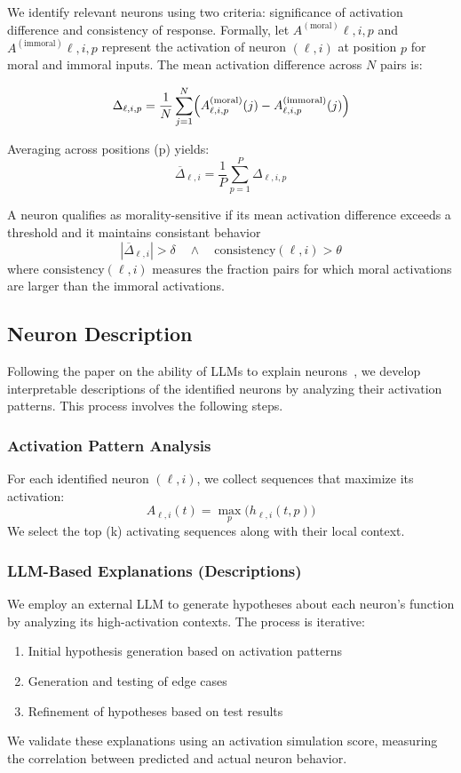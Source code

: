 \documentclass[runninghheads]{llncs}
\begin{document}
We identify relevant neurons using two criteria: significance of activation difference and consistency of response. Formally, let $A^{(\mathrm{moral})}{\ell, i, p}$ and $A^{(\mathrm{immoral})}{\ell, i, p}$ represent the activation of neuron $(\ell, i)$ at position $p$ for moral and immoral inputs. The mean activation difference across $N$ pairs is:

$$
\Delta_{\ell,i, p} = \frac{1}{N} \sum_{j=1}^{N}\Bigl(A^{(\mathrm{moral})}_{\ell, i, p}(j) - A^{(\mathrm{immoral})}_{\ell, i, p}(j)\Bigr)
$$

Averaging across positions (p) yields:
$$
\overline{\Delta}_{\ell, i} = \frac{1}{P} \sum_{p=1}^{P}\Delta_{\ell, i, p}
$$

A neuron qualifies as morality-sensitive if its mean activation difference exceeds a threshold and it maintains consistant behavior
$$
|\overline{\Delta}_{\ell, i}| > \delta   \quad \land \quad \mathrm{consistency}(\ell, i) > \theta
$$
where $\mathrm{consistency}(\ell, i)$ measures the fraction pairs for which moral activations are larger than the immoral activations.


\subsection{Neuron Description}

Following the paper on the ability of LLMs to explain neurons~\cite{bills2023language}, we develop interpretable descriptions of the identified neurons by analyzing their activation patterns. This process involves the following steps.

\subsubsection{Activation Pattern Analysis}
For each identified neuron $(\ell, i)$, we collect sequences that maximize its activation:
$$
A_{\ell, i}(t) = \max_{p} \bigl(h_{\ell,i}(t,p)\bigr)
$$
We select the top (k) activating sequences along with their local context.


\subsubsection{LLM-Based Explanations (Descriptions)}
We employ an external LLM to generate hypotheses about each neuron's function by analyzing its high-activation contexts. The process is iterative:
\begin{enumerate}
\item Initial hypothesis generation based on activation patterns
\item Generation and testing of edge cases
\item Refinement of hypotheses based on test results
\end{enumerate}
We validate these explanations using an activation simulation score, measuring the correlation between predicted and actual neuron behavior.
\end{document}
